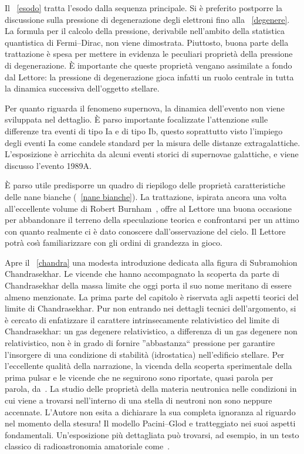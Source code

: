 Il \chaptername~\ref{esodo} tratta l'esodo dalla sequenza principale.  Si \`e
preferito postporre la discussione sulla pressione di degenerazione degli
elettroni fino alla \sectionname~\ref{degenere}.  La formula per il calcolo
della pressione, derivabile nell'ambito della statistica quantistica di
Fermi--Dirac, non viene dimostrata. Piuttosto, buona parte della trattazione \`e
spesa per mettere in evidenza le peculiari propriet\`a della pressione di
degenerazione. \`E importante che queste propriet\`a vengano assimilate a fondo
dal Lettore: la pressione di degenerazione gioca infatti un ruolo centrale in
tutta la dinamica successiva dell'oggetto stellare.

Per quanto riguarda il fenomeno supernova, la dinamica dell'evento non viene
sviluppata nel dettaglio. \`E parso importante focalizzate l'attenzione sulle
differenze tra eventi di tipo Ia e di tipo Ib, questo soprattutto visto
l'impiego degli eventi Ia come candele standard per la misura delle distanze
extragalattiche.  L'esposizione \`e arricchita da alcuni eventi storici di
supernovae galattiche, e viene discusso l'evento 1989A.

\`E parso utile predisporre un quadro di riepilogo delle propriet\`a
caratteristiche delle nane bianche (\sectionname~\ref{nane bianche}). La
trattazione, ispirata ancora una volta all'eccellente volume di Robert
Burnham~\Cite{burnham}, offre al Lettore una buona occasione per abbandonare il
terreno della speculazione teorica e confrontarsi per un attimo con quanto
realmente ci \`e dato conoscere dall'osservazione del cielo. Il Lettore potr\`a
cos\`{\i} familiarizzare con gli ordini di grandezza in gioco.

Apre il \chaptername~\ref{chandra} una modesta introduzione dedicata alla figura
di Subramohion Chandrasekhar. Le vicende che hanno accompagnato la scoperta da
parte di Chandrasekhar della massa limite che oggi porta il suo nome meritano di
essere almeno menzionate.  La prima parte del capitolo \`e riservata agli
aspetti teorici del limite di Chandrasekhar. Pur non entrando nei dettagli
tecnici dell'argomento, si \`e cercato di enfatizzare il carattere
intrinsecamente relativistico del limite di Chandrasekhar: un gas degenere
relativistico, a differenza di un gas degenere non relativistico,  non \`e in
grado di fornire ''abbastanza`` pressione per garantire l'insorgere di una
condizione di stabilit\`a (idrostatica) nell'edificio stellare.  Per
l'eccellente qualit\`a della narrazione, la vicenda della scoperta sperimentale
della prima pulsar e le vicende che ne seguirono sono riportate, quasi parola
per parola, da~\Cite{encicl}.  La studio delle  propriet\`a della materia
neutronica nelle condizioni in cui viene a trovarsi nell'interno di una stella
di neutroni non sono neppure accennate. L'Autore non esita a dichiarare la sua
completa ignoranza al riguardo nel momento della stesura!  Il modello
Pacini--Glod e tratteggiato nei suoi aspetti fondamentali. Un'esposizione pi\`u
dettagliata pu\`o trovarsi, ad esempio, in un testo classico di radioastronomia
amatoriale come~\Cite{krauss}.

